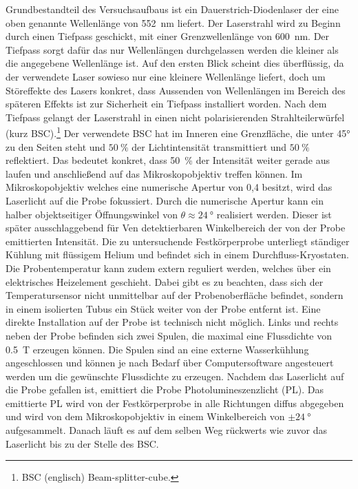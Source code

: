 Grundbestandteil des Versuchsaufbaus ist ein Dauerstrich-Diodenlaser der eine oben genannte Wellenlänge von 
\SI{552}{\nano\meter} liefert. 
Der Laserstrahl wird zu Beginn durch einen Tiefpass geschickt, mit einer Grenzwellenlänge von 
\SI{600}{\nano\meter}. Der Tiefpass sorgt dafür das nur Wellenlängen durchgelassen werden die 
kleiner als die angegebene Wellenlänge ist. Auf den ersten Blick scheint dies überflüssig, da der
verwendete Laser sowieso nur eine kleinere Wellenlänge liefert, doch um Störeffekte des Lasers 
konkret, dass Aussenden von Wellenlängen im Bereich des späteren Effekts ist zur Sicherheit ein
Tiefpass installiert worden. 
Nach dem Tiefpass gelangt der Laserstrahl in einen 
nicht polarisierenden Strahlteilerwürfel (kurz BSC).\footnote{BSC (englisch) Beam-splitter-cube.}
Der verwendete BSC hat im Inneren eine Grenzfläche, die unter 45° zu den Seiten 
steht und $\SI{50}{\percent}$ der Lichtintensität transmittiert und $\SI{50}{\percent}$ reflektiert.
Das bedeutet konkret, dass 
\SI{50}{\percent} der Intensität weiter gerade aus laufen und anschließend auf das Mikroskopobjektiv 
treffen können. Im Mikroskopobjektiv welches eine numerische Apertur von 0,4 besitzt, wird 
das Laserlicht auf die Probe fokussiert. Durch die numerische Apertur kann ein
halber objektseitiger Öffnungswinkel von $\theta \approx \SI{24}{\degree}$ realisiert werden. 
Dieser ist später ausschlaggebend für Ven detektierbaren Winkelbereich der von der Probe emittierten
Intensität. 
Die zu untersuchende Festkörperprobe unterliegt ständiger Kühlung mit flüssigem Helium und befindet
sich in einem  Durchfluss-Kryostaten. Die Probentemperatur kann zudem extern reguliert werden, welches
über  ein elektrisches Heizelement geschieht.
Dabei gibt es zu beachten, dass sich der Temperatursensor nicht unmittelbar auf der 
Probenoberfläche befindet, sondern in einem isolierten Tubus ein Stück weiter von der Probe entfernt
ist. Eine direkte Installation auf der Probe ist technisch nicht möglich. 
Links und rechts neben der Probe befinden sich zwei Spulen, die maximal eine Flussdichte von
\SI{0.5}{\tesla} erzeugen können. 
Die Spulen sind an eine externe Wasserkühlung angeschlossen und können je nach Bedarf 
über Computersoftware angesteuert werden um die gewünschte Flussdichte zu erzeugen. 
Nachdem das Laserlicht auf die Probe gefallen ist, emittiert die Probe Photolumineszenzlicht (PL).
Das emittierte PL wird von der Festkörperprobe in alle Richtungen diffus abgegeben und 
wird von dem Mikroskopobjektiv in einem Winkelbereich von $\pm \SI{24}{\degree}$ aufgesammelt. 
Danach läuft es auf dem selben Weg rückwerts wie zuvor das Laserlicht bis zu der Stelle des BSC.
